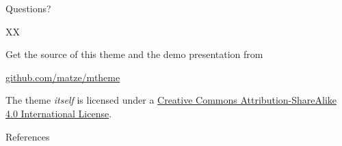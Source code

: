 \documentclass{beamer}
\begin{document}
\begin{frame}[standout]
  Questions?
\end{frame}

\begin{frame}{XX}
  
Get the source of this theme and the demo presentation from

\begin{center}\url{github.com/matze/mtheme}\end{center}

The theme \emph{itself} is licensed under a \href{http://creativecommons.org/licenses/by-sa/4.0/}{Creative Commons Attribution-ShareAlike 4.0 International License}.


\end{frame}

\begin{frame}{References}
  
  
\end{frame}
\end{document}
